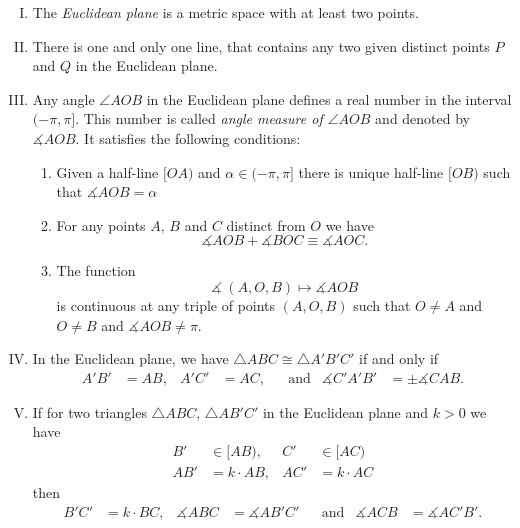 \begin{enumerate}[I.]
\item\label{def:birkhoff-axioms:0} The \emph{Euclidean plane} is a metric space with at least two points.


\item\label{def:birkhoff-axioms:1} There is one and only one line, 
that contains any two given distinct points $P$ and $Q$ in the Euclidean plane.

\item\label{def:birkhoff-axioms:2} 
Any angle $\angle AOB$ in the Euclidean plane 
defines a real number in the interval $(-\pi,\pi]$.
This number is called \emph{angle measure of $\angle AOB$}
and denoted by $\measuredangle A O B$.
It satisfies the following conditions:
\begin{enumerate}
\item\label{def:birkhoff-axioms:2a} Given a half-line $[O A)$ and $\alpha\in(-\pi,\pi]$ there is unique  half-line $[O B)$ such that $\measuredangle A O B= \alpha$
\item\label{def:birkhoff-axioms:2b} For any points $A$, $B$ and $C$ distinct from $O$ we have
$$\measuredangle A O B+\measuredangle B O C
\equiv\measuredangle A O C.$$
\item\label{def:birkhoff-axioms:2c} 
The function 
$$\measuredangle\:(A,O,B)\mapsto\measuredangle A O B$$
is continuous at any triple of points $(A,O,B)$
such that $O\ne A$ and $O\ne B$ and $\measuredangle A O B\ne\pi$.

\end{enumerate}

\item\label{def:birkhoff-axioms:3}  In the Euclidean plane, we have
$\triangle A B C\cong\triangle A' B' C'$
if and only if 
\begin{align*}
A' B'&=A B, & A' C'&= A C, &&\text{and}
&\measuredangle C' A' B'&=\pm\measuredangle C A B.
\end{align*}
\item\label{def:birkhoff-axioms:4}
If for two triangles 
$\triangle ABC$, 
$\triangle AB'C'$ in the Euclidean plane
and $k>0$ we have
\begin{align*}
B'&\in [AB),
& C'&\in [AC)
\\
AB'&=k\cdot AB,&
AC'&=k\cdot AC
\end{align*}
then
\begin{align*}
B'C'&=k\cdot BC,&
\measuredangle ABC&=\measuredangle AB'C'
&&\text{and}
&
\measuredangle ACB&=\measuredangle AC'B'.
\end{align*}
\end{enumerate}

